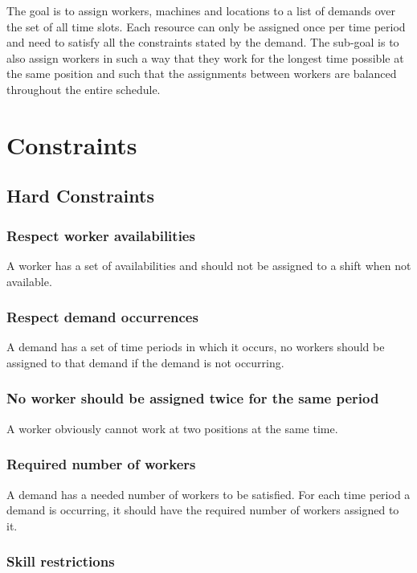 \documentclass[../thesis.tex]{subfiles}
\begin{document}
The goal is to assign workers, machines and locations to a list of demands over the set of all time slots.
Each resource can only be assigned once per time period and need to satisfy all the constraints stated by the demand. 
The sub-goal is to also assign workers in such a way that they work for the longest time possible at the same position and 
 such that the assignments between workers are balanced throughout the entire schedule.

\section{Constraints}
\subsection{Hard Constraints}

\subsubsection{Respect worker availabilities}

A worker has a set of availabilities and should not be assigned to a 
shift when not available.

\subsubsection{Respect demand occurrences}

A demand has a set of time periods in which it occurs,
no workers should be assigned to that demand if the demand is not 
occurring.

\subsubsection{No worker should be assigned twice for the same period}

A worker obviously cannot work at two positions at the same time. 

\subsubsection{Required number of workers}

A demand has a needed number of workers to be satisfied. 
For each time period a demand is occurring, it should have the required 
number of workers assigned to it.

\subsubsection{Skill restrictions}
\end{document}
